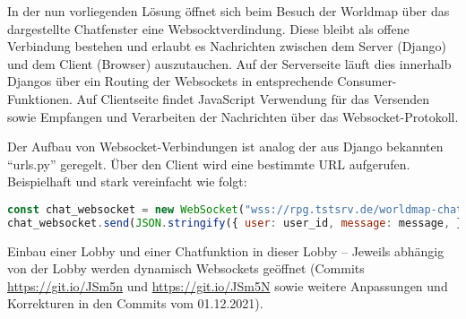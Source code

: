 In der nun vorliegenden Lösung öffnet sich beim Besuch der Worldmap über das dargestellte Chatfenster eine Websocktverdindung. Diese bleibt als offene Verbindung bestehen und erlaubt es Nachrichten zwischen dem Server (Django) und dem Client (Browser) auszutauchen. Auf der Serverseite läuft dies innerhalb Djangos über ein Routing der Websockets in entsprechende Consumer-Funktionen. Auf Clientseite findet JavaScript Verwendung für das Versenden sowie Empfangen und Verarbeiten der Nachrichten über das Websocket-Protokoll. 

Der Aufbau von Websocket-Verbindungen ist analog der aus Django bekannten \enquote{urls.py} geregelt. Über den Client wird eine bestimmte URL aufgerufen. Beispielhaft und stark vereinfacht wie folgt: 


\begin{lstlisting}[language=JavaScript]
const chat_websocket = new WebSocket("wss://rpg.tstsrv.de/worldmap-chat/");
chat_websocket.send(JSON.stringify({ user: user_id, message: message, }));
\end{lstlisting}



Einbau einer Lobby und einer Chatfunktion in dieser Lobby -- Jeweils abhängig von der Lobby werden dynamisch Websockets geöffnet (Commits \url{https://git.io/JSm5n} und \url{https://git.io/JSm5N} sowie weitere Anpassungen und Korrekturen in den Commits vom 01.12.2021).



